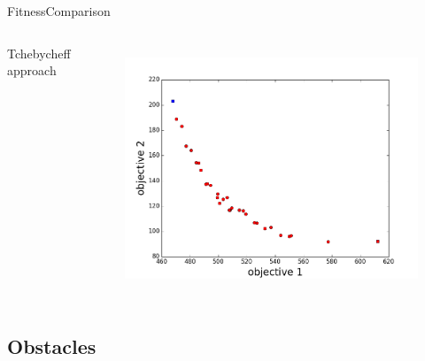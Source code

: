 \begin{frame}{Fitness}{Comparison}
\begin{columns}
	{ Tchebycheff approach}
	\begin{figure}
		\centering
		\includegraphics[width=\linewidth]{figure/sim2-2obj/PF02-MORRT2.png}
		\label{fig:sim:01:fit3}
	\end{figure}
\end{columns}
\end{frame}

\subsection{Obstacles}

